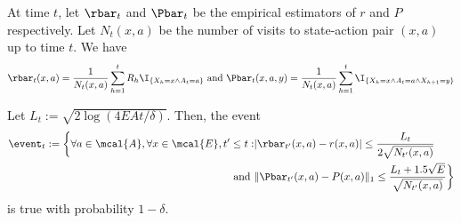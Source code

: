 At time $t$, let $\rbar_t$ and $\Pbar_t$ be the empirical estimators of $r$ and $P$ respectively.
Let $N_t(x,a)$ be the number of visits to state-action pair $(x,a)$ up to time $t$.
We have
\begin{align*}
\rbar_t(x,a) =\frac1{N_t(x,a)}\sum_{h=1}^{t}R_h\I_{\{X_h=x\wedge A_t=a\}} \text{ and } \Pbar_t(x,a,y) =\frac1{N_t(x,a)}\sum_{h=1}^{t}\I_{\{X_h=x\wedge A_t=a\wedge X_{h+1}=y\}}
\end{align*}

\begin{lemma}
\label{lem:high_prob_event}
Let $L_t:=\sqrt{2\log(4EAt/\delta)}$. Then, the event
\begin{align}
\event_t:=\bigg\{\forall a\in\mcal{A}, \forall x\in\mcal{E}, t'\le t: &\vert\rbar_{t'}(x,a)-r(x,a)\vert\le \frac{L_t}{2\sqrt{N_{t'}(x,a)}}\\
\text{ and } &\Vert\Pbar_{t'}(x,a)-P(x,a)\Vert_1\le \frac{L_t+1.5\sqrt{E}}{\sqrt{N_{t'}(x,a)}}\bigg\}
\end{align}
is true with probability $1-\delta$.
\end{lemma}
